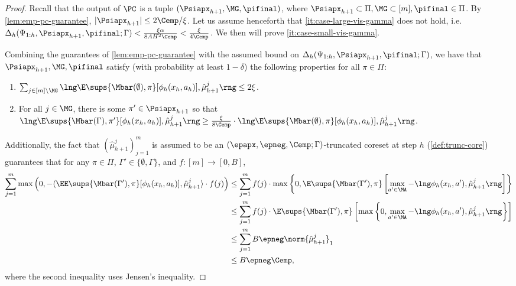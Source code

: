 \documentclass[11pt, oneside]{article}
\theoremstyle{plain}
\theoremstyle{definition}
\numberwithin{theorem}{section}
\renewcommand{\^}[1]{^{(#1)}}
\begin{document}
\begin{proof}
  Recall that the output of $\PC$ is a tuple $(\Psiapx_{h+1}, \MG, \pifinal)$, where $\Psiapx_{h+1} \subset \Pi, \MG \subset [m], \pifinal \in \Pi$. 
By \cref{lem:emp-pc-guarantee}, $|\Psiapx_{h+1}| \leq 2\Cemp/\xi$. Let us assume henceforth that \cref{it:case-large-vis-gamma} does not hold, i.e. $\Delta_h(\Psi_{1:h},\Psiapx_{h+1},\pifinal;\Gamma) < \frac{\xi \alpha}{8AH^2 \Cemp} < \frac{\xi}{4\Cemp}$. We then will prove \cref{it:case-small-vis-gamma}.

Combining the guarantees of \cref{lem:emp-pc-guarantee} with the assumed bound on $\Delta_h(\Psi_{1:h},\Psiapx_{h+1},\pifinal;\Gamma)$, we have that $\Psiapx_{h+1}, \MG, \pifinal$ satisfy (with probability at least $1-\delta$) the following properties for all $\pi \in \Pi$:
  \begin{enumerate}%
  \item \label{it:missed-inds-trunc} $\sum_{j \in [m]\setminus \MG} \lng \E\sups{\Mbar(\emptyset), \pi}[\phi_h(x_h, a_h)], \hat \mu_{h+1}^j \rng \leq 2\xi$.
  \item \label{it:hit-inds-trunc} For all $j \in \MG$, there is some $\pi' \in \Psiapx_{h+1}$ so that $\lng\E\sups{\Mbar(\Gamma),\pi'}[\phi_h(x_h, a_h)], \hat \mu_{h+1}^j \rng \geq \frac{\xi}{8 \Cemp} \cdot \lng \E\sups{\Mbar(\emptyset), \pi}[\phi_h(x_h, a_h)], \hat \mu_{h+1}^j \rng$. 
  \end{enumerate}
  Additionally, the fact that $(\hat \mu_{h+1}^j)_{j=1}^m$ is assumed to be an $(\epapx, \epneg, \Cemp; \Gamma)$-truncated coreset at step $h$ (\cref{def:trunc-core}) guarantees that for any $\pi \in \Pi$, $\Gamma' \in \{\emptyset, \Gamma\}$, and $f: [m]\to[0,B]$,
\begin{align}
  \sum_{j=1}^m \max\left(0, -\langle \EE\sups{\Mbar(\Gamma'), \pi}[\phi_h(x_h,a_h)], \hat\mu_{h+1}^j\rangle \cdot f(j)\right)
  &\leq \sum_{j=1}^m f(j) \cdot \max \left\{ 0, \E\sups{\Mbar(\Gamma'), \pi} \left[ \max_{a' \in \MA} - \lng \phi_h(x_h, a'), \hat \mu_{h+1}^j\rng \right] \right\}\nonumber\\
  &\leq\sum_{j=1}^m f(j) \cdot \E\sups{\Mbar(\Gamma'), \pi} \left[ \max\left\{ 0, \max_{a' \in \MA} -\lng \phi_h(x_h, a'), \hat \mu_{h+1}^j \rng \right\} \right] \nonumber\\
  & \leq  \sum_{j=1}^m B\epneg \norm{\hat\mu_{h+1}^j}_1 \nonumber \\
&\leq B\epneg \Cemp,
\label{eq:hatmu-neg-error-trunc}
\end{align}
where the second inequality uses Jensen's inequality.


\end{proof}
\end{document}
